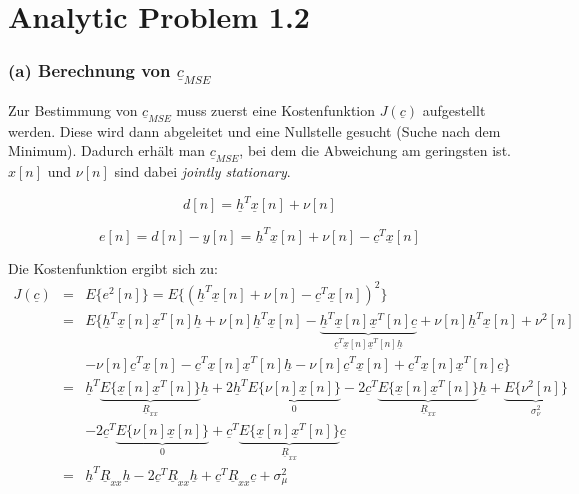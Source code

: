 \clearpage
\chapter{Analytic Problem 1.2}

\subsection{(a) Berechnung von $\underline{c}_{MSE}$}
Zur Bestimmung von $\underline{c}_{MSE}$ muss zuerst eine Kostenfunktion $J(\underline{c})$ aufgestellt werden. Diese wird dann abgeleitet und eine Nullstelle gesucht (Suche nach dem Minimum). Dadurch erhält man $\underline{c}_{MSE}$, bei dem die Abweichung am geringsten ist. $x[n]$ und $\nu [n]$ sind dabei \emph{jointly stationary}.

\begin{equation}
  d[n] = \underline{h}^T \underline{x}[n] + \nu [n]
\end{equation}

\begin{equation}
 e[n] = d[n] - y[n] = \underline{h}^T \underline{x}[n] + \nu [n] - \underline{c}^T \underline{x}[n]
\end{equation}

Die Kostenfunktion ergibt sich zu:
\begin{eqnarray}
 J(\underline{c}) & = & E\{e^2[n]\} = E\{(\underline{h}^T \underline{x}[n] + \nu [n] - \underline{c}^T \underline{x}[n])^2\} \\
 & = & E\{\underline{h}^T \underline{x}[n] \underline{x}^T[n] \underline{h} + \nu [n] \underline{h}^T \underline{x}[n] - \underbrace{\underline{h}^T \underline{x}[n] \underline{x}^T[n] \underline{c}}_{\underline{c}^T \underline{x}[n] \underline{x}^T[n] \underline{h}} + \nu [n] \underline{h}^T \underline{x}[n] + \nu^2[n] \\
 & & - \nu [n] \underline{c}^T \underline{x}[n] - \underline{c}^T \underline{x}[n] \underline{x}^T[n] \underline{h} - \nu [n] \underline{c}^T \underline{x}[n] + \underline{c}^T \underline{x}[n] \underline{x}^T[n] \underline{c}\} \\
 & = & \underline{h}^T \underbrace{E\{\underline{x}[n] \underline{x}^T[n]\}}_{\underline{R}_{xx}} \underline{h} + 2 \underline{h}^T \underbrace{E\{\nu [n] \underline{x}[n]\}}_{0} - 2 \underline{c}^T \underbrace{E\{\underline{x}[n] \underline{x}^T[n]\}}_{\underline{R}_{xx}} \underline{h} + \underbrace{E\{\nu^2[n]\}}_{\sigma_\nu^2} \\
 & & - 2 \underline{c}^T \underbrace{E\{\nu [n] \underline{x}[n]\}}_{0} + \underline{c}^T \underbrace{E\{\underline{x}[n] \underline{x}^T[n]\}}_{\underline{R}_{xx}} \underline{c} \\
 & = & \underline{h}^T \underline{R}_{xx} \underline{h} - 2 \underline{c}^T \underline{R}_{xx} \underline{h} + \underline{c}^T \underline{R}_{xx} \underline{c} + \sigma_\mu^2
\end{eqnarray}

